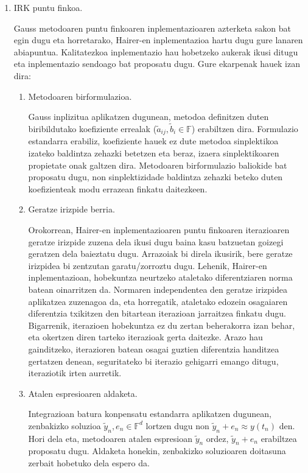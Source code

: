 \begin{enumerate}
\item IRK puntu finkoa.

Gauss metodoaren puntu finkoaren inplementazioaren azterketa sakon bat egin dugu eta horretarako, Hairer-en inplementazioa \cite{Hairer2008} hartu dugu gure lanaren abiapuntua. Kalitatezkoa inplementazio hau hobetzeko aukerak ikusi ditugu eta inplementazio sendoago bat proposatu dugu. Gure ekarpenak hauek izan dira:  

\begin{enumerate}
\item Metodoaren birformulazioa.

Gauss inplizitua aplikatzen dugunean, metodoa definitzen duten biribildutako koefiziente errealak ($\tilde{a}_{ij}, \tilde{b}_i \in \mathbb{F}$) erabiltzen dira. Formulazio estandarra erabiliz, koefiziente hauek ez dute metodoa sinplektikoa izateko baldintza zehazki betetzen eta beraz, izaera sinplektikoaren propietate onak galtzen dira. Metodoaren birformulazio baliokide bat proposatu dugu, non sinplektizidade baldintza zehazki beteko duten koefizienteak modu errazean finkatu daitezkeen.

\item Geratze irizpide berria.

Orokorrean, Hairer-en inplementazioaren puntu finkoaren iterazioaren geratze irizpide zuzena dela ikusi dugu baina kasu batzuetan goizegi geratzen dela baieztatu dugu. Arrazoiak bi direla ikusirik, bere geratze irizpidea bi zentzutan garatu/zorroztu dugu. Lehenik, Hairer-en inplementazioan, hobekuntza neurtzeko ataletako diferentziaren norma batean oinarritzen da. Normaren independentea den geratze irizpidea aplikatzea zuzenagoa da, eta horregatik, ataletako edozein osagaiaren diferentzia txikitzen den bitartean iterazioan jarraitzea finkatu dugu. Bigarrenik, iterazioen hobekuntza ez du zertan beherakorra izan behar, eta okertzen diren tarteko iterazioak gerta daitezke. Arazo hau gainditzeko, iterazioren batean osagai guztien diferentzia handitzea gertatzen denean, seguritateko bi iterazio gehigarri emango ditugu, iteraziotik irten aurretik.   

\item Atalen espresioaren aldaketa.

Integrazioan batura konpensatu estandarra aplikatzen dugunean, zenbakizko soluzioa $\tilde{y}_n, e_n \in \mathbb{F}^d$ lortzen dugu non $\tilde{y}_n+e_n \approx y(t_n)$ den. Hori dela eta, metodoaren atalen espresioan $\tilde{y}_n$ ordez, $\tilde{y}_n+e_n$ erabiltzea proposatu dugu. Aldaketa honekin, zenbakizko soluzioaren doitasuna zerbait hobetuko dela espero da.


\end{enumerate}
\end{enumerate}
